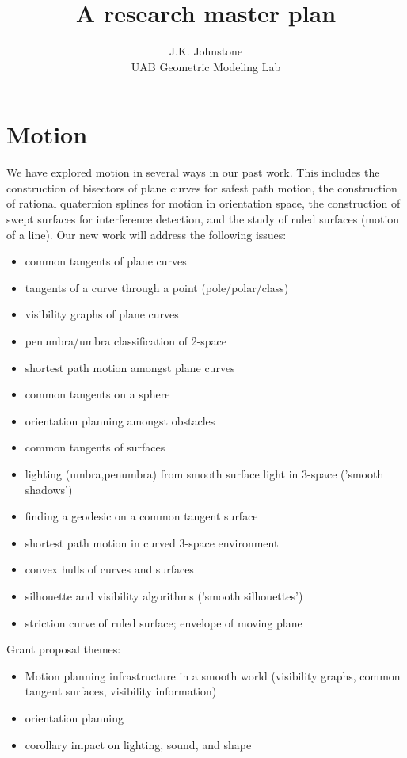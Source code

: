\documentclass[11pt,titlepage]{article}
\title{A research master plan}
\author{J.K. Johnstone\\UAB Geometric Modeling Lab}
\begin{document}
\maketitle

\section{Motion}

We have explored motion in several ways in our past work.
This includes the construction of bisectors of plane curves for safest path motion,
the construction of rational quaternion splines for motion in orientation space,
the construction of swept surfaces for interference detection,
and the study of ruled surfaces (motion of a line).
Our new work will address the following issues:
%
\begin{itemize}
\item   common tangents of plane curves
\item   tangents of a curve through a point (pole/polar/class)
\item   visibility graphs of plane curves
\item   penumbra/umbra classification of 2-space
\item   shortest path motion amongst plane curves
\item   common tangents on a sphere
\item   orientation planning amongst obstacles
\item   common tangents of surfaces
\item	lighting (umbra,penumbra) from smooth surface light in 3-space ('smooth shadows')
\item	finding a geodesic on a common tangent surface
\item	shortest path motion in curved 3-space environment
\item	convex hulls of curves and surfaces
\item	silhouette and visibility algorithms ('smooth silhouettes')
\item	striction curve of ruled surface; envelope of moving plane
\end{itemize}
%
Grant proposal themes:
\begin{itemize}
\item
Motion planning infrastructure in a smooth world
(visibility graphs, common tangent surfaces, visibility information)
\item orientation planning
\item corollary impact on lighting, sound, and shape
\end{itemize}
\end{document}
